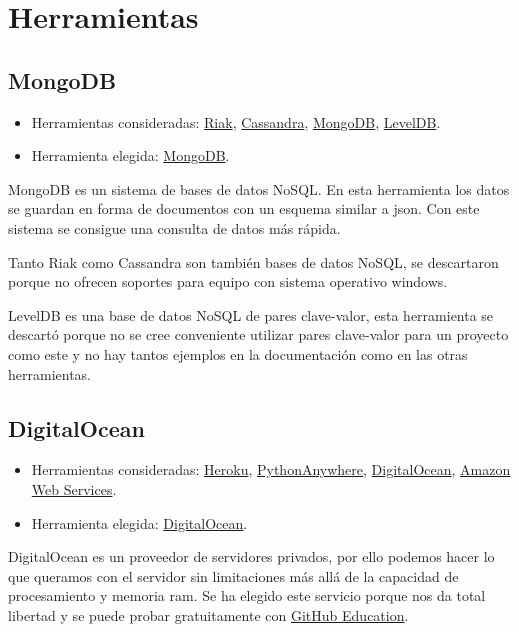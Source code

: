 
\section{Herramientas}

\subsection{MongoDB}

\begin{itemize}
	\tightlist
	\item
	Herramientas consideradas:
	\href{http://basho.com/riak/}{Riak}, 
	\href{http://cassandra.apache.org/}{Cassandra},
	\href{https://www.mongodb.com/}{MongoDB}, 
	\href{http://leveldb.org/}{LevelDB}.
	\item
	Herramienta elegida:
	\href{https://www.mongodb.com/}{MongoDB}.
\end{itemize}

MongoDB es un sistema de bases de datos NoSQL. En esta herramienta los datos se guardan en forma de documentos con un esquema similar a json. Con este sistema se consigue una consulta de datos más rápida.

Tanto Riak como Cassandra son también bases de datos NoSQL, se descartaron porque no ofrecen soportes para equipo con sistema operativo windows. 

LevelDB es una base de datos NoSQL de pares clave-valor, esta herramienta se descartó porque no se cree conveniente utilizar pares clave-valor para un proyecto como este y no hay tantos ejemplos en la documentación como en las otras herramientas.

\subsection{DigitalOcean}

\begin{itemize}
	\tightlist
	\item
	Herramientas consideradas:
	\href{https://www.heroku.com/}{Heroku}, 
	\href{https://www.pythonanywhere.com/}{PythonAnywhere},
	\href{https://www.digitalocean.com/}{DigitalOcean}, 
	\href{https://aws.amazon.com/es/}{Amazon Web Services}.
	\item
	Herramienta elegida:
	\href{https://www.digitalocean.com/}{DigitalOcean}.
\end{itemize}

DigitalOcean es un proveedor de servidores privados, por ello podemos hacer lo que queramos con el servidor sin limitaciones más allá de la capacidad de procesamiento y memoria ram. Se ha elegido este servicio porque nos da total libertad y se puede probar gratuitamente con \href{https://education.github.com/}{GitHub Education}.

